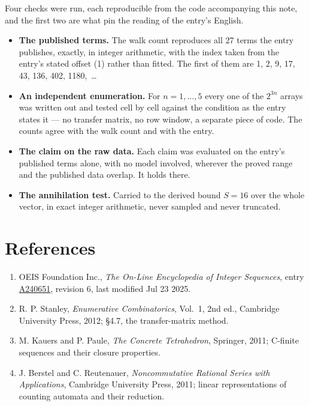 \documentclass[11pt]{article}
\theoremstyle{definition}
\begin{document}
Four checks were run, each reproducible from the code accompanying this note, and the first two are what pin the reading of the entry's English.

\begin{itemize}

\item {\bfseries The published terms.} The walk count reproduces all 27 terms the entry publishes, exactly, in integer arithmetic, with the index taken from the entry's stated offset (1) rather than fitted. The first of them are 1, 2, 9, 17, 43, 136, 402, 1180,~\dots

\item {\bfseries An independent enumeration.} For $n = 1,\dots,5$ every one of the $2^{3n}$ arrays was written out and tested cell by cell against the condition as the entry states it --- no transfer matrix, no row window, a separate piece of code. The counts agree with the walk count and with the entry.

\item {\bfseries The claim on the raw data.} Each claim was evaluated on the entry's published terms alone, with no model involved, wherever the proved range and the published data overlap. It holds there.

\item {\bfseries The annihilation test.} Carried to the derived bound $S = 16$ over the whole vector, in exact integer arithmetic, never sampled and never truncated.

\end{itemize}

\section{References}

\begin{enumerate}

\item OEIS Foundation Inc., \emph{The On-Line Encyclopedia of Integer Sequences}, entry \href{https://oeis.org/A240651}{A240651}, revision 6, last modified Jul 23 2025.

\item R. P. Stanley, \emph{Enumerative Combinatorics}, Vol.~1, 2nd ed., Cambridge University Press, 2012; \S4.7, the transfer-matrix method.

\item M. Kauers and P. Paule, \emph{The Concrete Tetrahedron}, Springer, 2011; C-finite sequences and their closure properties.

\item J. Berstel and C. Reutenauer, \emph{Noncommutative Rational Series with Applications}, Cambridge University Press, 2011; linear representations of counting automata and their reduction.

\end{enumerate}
\end{document}
